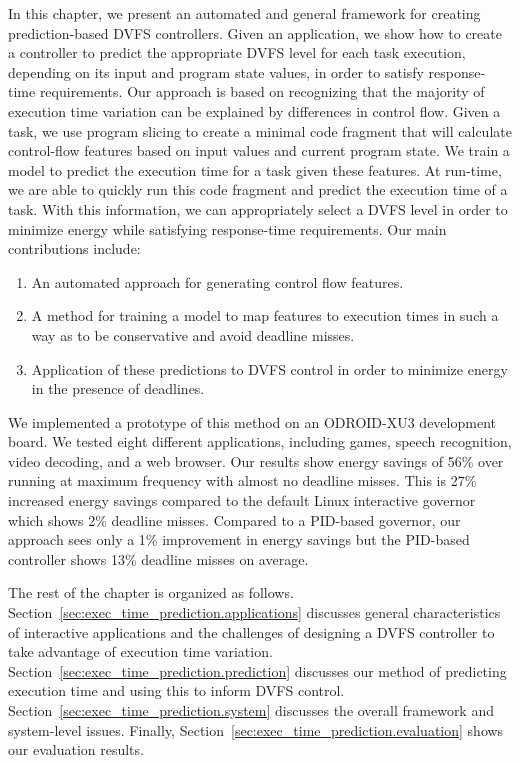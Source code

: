 In this chapter, we present an automated and general framework for creating
prediction-based DVFS controllers. Given an application, we show how to create
a controller to predict the appropriate DVFS level for each task execution,
depending on its input and program state values, in order to satisfy
response-time requirements. Our approach is based on recognizing that the
majority of execution time variation can be explained by differences in control
flow.  Given a task, we use program slicing to create a minimal code fragment
that will calculate control-flow features based on input values and current
program state. We train a model to predict the execution time for a task given
these features. At run-time, we are able to quickly run this code fragment and
predict the execution time of a task. With this information, we can
appropriately select a DVFS level in order to minimize energy while satisfying
response-time requirements.  Our main contributions include:
\begin{enumerate}
  \item An automated approach for generating control flow features.
  \item A method for training a model to map features to execution times in
  such a way as to be conservative and avoid deadline misses.
  \item Application of these predictions to DVFS control in order to minimize
  energy in the presence of deadlines.
\end{enumerate}

We implemented a prototype of this method on an ODROID-XU3 development board.
We tested eight different applications, including games, speech recognition,
video decoding, and a web browser. Our results show energy savings of 56\% over
running at maximum frequency with almost no deadline misses. This is 27\%
increased energy savings compared to the default Linux interactive governor
which shows 2\% deadline misses.  Compared to a PID-based governor, our
approach sees only a 1\% improvement in energy savings but the PID-based
controller shows 13\% deadline misses on average.

The rest of the chapter is organized as follows.
Section~\ref{sec:exec_time_prediction.applications} discusses general
characteristics of interactive applications and the challenges of designing a
DVFS controller to take advantage of execution time variation.
Section~\ref{sec:exec_time_prediction.prediction} discusses our method of
predicting execution time and using this to inform DVFS control.
Section~\ref{sec:exec_time_prediction.system} discusses the overall framework
and system-level issues. Finally, Section~\ref{sec:exec_time_prediction.evaluation}
shows our evaluation results. 
